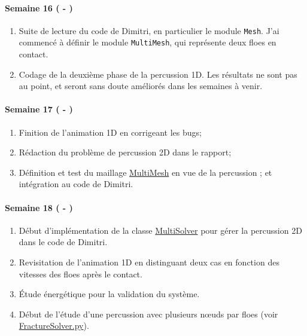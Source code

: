 \paragraph{Semaine 16 ( - )} 
\begin{enumerate}
    \item Suite de lecture du code de Dimitri, en particulier le module \texttt{Mesh}. J'ai commencé à définir le module \texttt{MultiMesh}, qui représente deux floes en contact. 
    \item Codage de la deuxième phase de la percussion 1D. Les résultats ne sont pas au point, et seront sans doute améliorés dans les semaines à venir.
\end{enumerate}
  

\paragraph{Semaine 17 ( - )} 
\begin{enumerate}
    \item Finition de l'animation 1D en corrigeant les bugs;
    \item Rédaction du problème de percussion 2D dans le rapport;
    \item Définition et test du maillage \href{https://framagit.org/RaK/SimuRessorts/-/blob/master/springslattice/multimesh.py}{MultiMesh} en vue de la percussion ; et intégration au code de Dimitri.
\end{enumerate}
  

\paragraph{Semaine 18 ( - )} 
\begin{enumerate}
    \item Début d'implémentation de la classe \href{https://framagit.org/RaK/SimuRessorts/-/blob/master/springslattice/multisolver.py}{MultiSolver} pour gérer la percussion 2D dans le code de Dimitri.
    \item Revisitation de l'animation 1D en distinguant deux cas en fonction des vitesses des floes après le contact.
    \item Étude énergétique pour la validation du système.
    \item Début de l'étude d'une percussion avec plusieurs n\oe{}uds par floes (voir \href{https://github.com/desmond-rn/ice-floes/blob/master/code/simu1D/FractureSolver.py}{FractureSolver.py}).
\end{enumerate}
  

